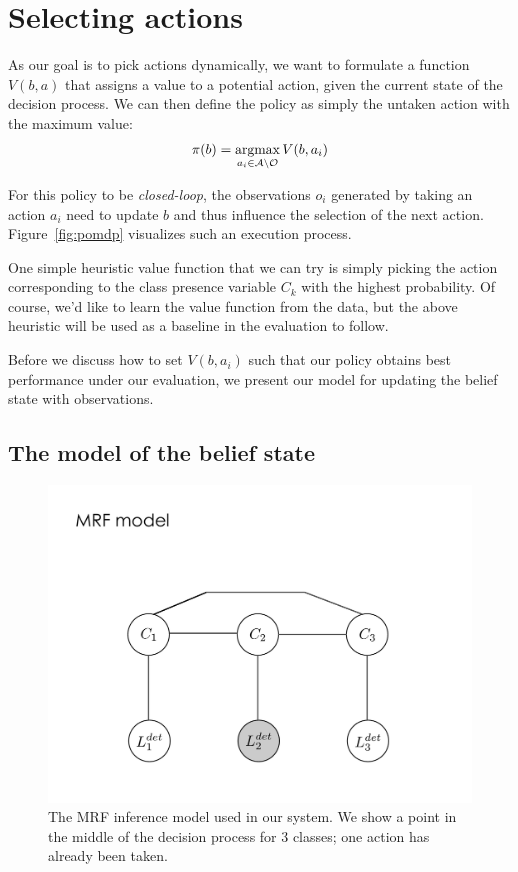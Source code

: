\section{Selecting actions} \label{sec:value}
As our goal is to pick actions dynamically, we want to formulate a function $V(b,a)$  that assigns a value to a potential action, given the current state of the decision process.
We can then define the policy as simply the untaken action with the maximum value:
\begin{align}
\pi(b) = \argmax_{a_i \in \mathcal{A} \setminus \mathcal{O}} V(b,a_i)
\end{align}

For this policy to be \emph{closed-loop}, the observations $o_i$ generated by taking an action $a_i$ need to update $b$ and thus influence the selection of the next action.
Figure~\ref{fig:pomdp} visualizes such an execution process.

One simple heuristic value function that we can try is simply picking the action corresponding to the class presence variable $C_k$ with the highest probability.
Of course, we'd like to learn the value function from the data, but the above heuristic will be used as a baseline in the evaluation to follow.

Before we discuss how to set $V(b,a_i)$ such that our policy obtains best performance under our evaluation, we present our model for updating the belief state with observations.

\subsection{The model of the belief state}
\begin{figure}[h!]
\centering
\includegraphics[width=0.56\linewidth]{../figures/inf_model_mrf_1.pdf}
\caption{
The MRF inference model used in our system.
We show a point in the middle of the decision process for 3 classes; one action has already been taken.
}
\label{fig:model}
\end{figure}

